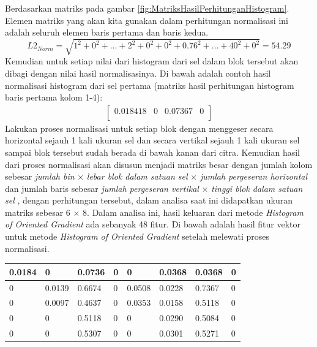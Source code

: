 \begin{enumerate}
\begin{table}[H]
\end{table}
Berdasarkan matriks pada gambar \ref{fig:MatriksHasilPerhitunganHistogram}. Elemen matriks yang akan kita gunakan dalam perhitungan normalisasi ini adalah seluruh elemen baris pertama dan baris kedua.
\begin{equation*}
L2_{Norm} = \sqrt{1^2 + 0^2 + \ldots + 2^2 + 0^2 + 0^2 + 0.76^2 + \ldots + 40^2 + 0^2} = 54.29
\end{equation*}
Kemudian untuk setiap nilai dari histogram dari sel dalam blok tersebut akan dibagi dengan nilai hasil normalisasinya. Di bawah adalah contoh hasil normalisasi histogram dari sel pertama (matriks hasil perhitungan histogram baris pertama kolom 1-4):
\begin{gather*}
\begin{bmatrix}
0.018418 & 0 & 0.07367 & 0 \\
\end{bmatrix}
\end{gather*}
Lakukan proses normalisasi untuk setiap blok dengan menggeser secara horizontal sejauh 1 kali ukuran sel dan secara vertikal sejauh 1 kali ukuran sel sampai blok tersebut sudah berada di bawah kanan dari citra. Kemudian hasil dari proses normalisasi akan disusun menjadi matriks besar dengan jumlah kolom sebesar  \textit{jumlah bin} $\times$ \textit{lebar blok dalam satuan sel} $\times$ \textit{jumlah pergeseran horizontal} dan jumlah baris sebesar \textit{jumlah pergeseran vertikal} $\times$ \textit{tinggi blok dalam satuan sel} , dengan perhitungan tersebut, dalam analisa saat ini didapatkan ukuran matriks sebesar 6 $\times$ 8. Dalam analisa ini, hasil keluaran dari metode \textit{Histogram of Oriented Gradient} ada sebanyak 48 fitur. Di bawah adalah hasil fitur vektor untuk metode \textit{Histogram of Oriented Gradient} setelah melewati proses normalisasi.\\
\begin{table}[H]
	\centering
	\begin{small}
		\begin{tabular}{|p{1cm}|p{1cm}|p{1cm}|p{1cm}|p{1cm}|p{1cm}|p{1cm}|p{1cm}|}
			\hline
			0.0184 & 0 & 0.0736 & 0 & 0 & 0.0368 & 0.0368 & 0\\
			\hline
			0 & 0.0139 & 0.6674 & 0 & 0.0508 & 0.0228 & 0.7367 & 0\\
			\hline
			0 & 0.0097 & 0.4637 & 0 & 0.0353 & 0.0158 & 0.5118 & 0\\
			\hline
			0 & 0 & 0.5118 & 0 & 0 & 0.0290 & 0.5084 & 0 \\
			\hline
			0 & 0 & 0.5307 & 0 & 0 & 0.0301 & 0.5271 & 0 \\

\end{tabular}
\end{small}
\end{table}
\end{enumerate}

